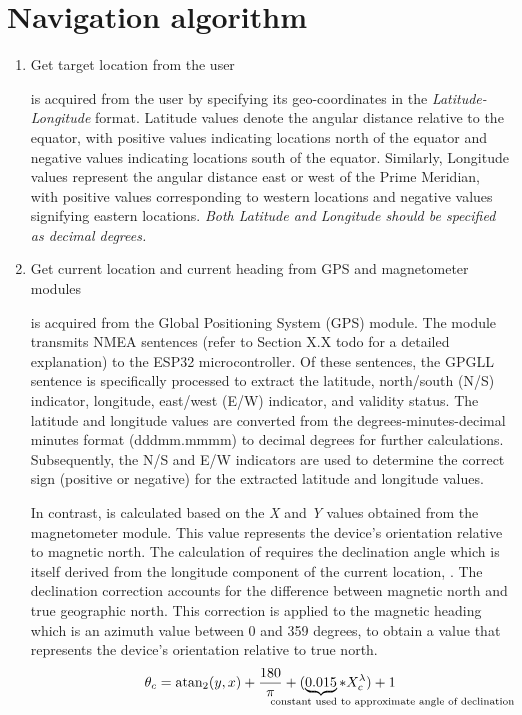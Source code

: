 \section{Navigation algorithm}
\begin{enumerate}
  \item  Get target location \tLoc from the user

        \tLoc is acquired from the user by specifying its geo-coordinates in the \emph{Latitude-Longitude} format. Latitude values denote the angular distance relative
        to the equator, with positive values indicating locations north of the equator and negative values indicating locations south of the equator. Similarly, Longitude values
        represent the angular distance east or west of the Prime Meridian, with positive values corresponding to western locations and negative values signifying eastern locations.
        \emph{Both Latitude and Longitude should be specified as decimal degrees.}

  \item  Get current location \cLoc and current heading \heading from GPS and magnetometer modules

        \cLoc is acquired from the Global Positioning System (GPS) module. The module transmits NMEA sentences (refer to Section X.X todo for a detailed
        explanation) to the ESP32 microcontroller.  Of these sentences, the GPGLL sentence is specifically processed to extract the latitude, north/south (N/S) indicator, longitude,
        east/west (E/W) indicator, and validity status.  The latitude and longitude values are converted from the degrees-minutes-decimal minutes format (dddmm.mmmm)
        to decimal degrees for further calculations.  Subsequently, the N/S and E/W indicators are used to determine the correct sign (positive or negative) for the extracted
        latitude and longitude values.

        In contrast, \heading is calculated based on the \emph X and \emph Y values obtained from the magnetometer module.
        This value represents the device's orientation relative to magnetic north. The calculation of \heading requires the declination angle \decAngle which is itself derived from the
        longitude component of the current location, \cLoc. The declination correction accounts for the difference between magnetic north and true geographic north.  This correction is
        applied to the magnetic heading which is an azimuth value between 0 and 359 degrees, to obtain a value that represents the device's orientation relative to
        true north.
        $$ \theta_c = \atantwo(y, x) + \frac{180}{\pi} + (\underbrace{0.015}_{\mathclap {\text{\hspace{+3.5cm} constant used to approximate angle of declination}}} * X_c^\lambda) + 1 $$


\end{enumerate}
